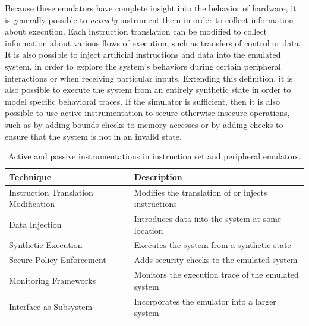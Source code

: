 Because these emulators have complete insight into the behavior of hardware, it is generally possible to \emph{actively} instrument them in order to collect information about execution.
Each instruction translation can be modified to collect information about various flows of execution, such as transfers of control or data.
It is also possible to inject artificial instructions and data into the emulated system, in order to explore the system's behaviors during certain peripheral interactions or when receiving particular inputs.
Extending this definition, it is also possible to execute the system from an entirely synthetic state in order to model specific behavioral traces.
If the simulator is sufficient, then it is also possible to use active instrumentation to secure otherwise insecure operations, such as by adding bounds checks to memory accesses or by adding checks to ensure that the system is not in an invalid state.

\begin{table}[h]
\centering
\begin{tabular}{|l|l|}
\hline
\textbf{Technique} & \textbf{Description} \\ \hline
\multirow{2}{*}{Instruction Translation Modification} & \multirow{2}{*}{Modifies the translation of or injects instructions} \\
 & \\ \hline
\multirow{2}{*}{Data Injection} & \multirow{2}{*}{Introduces data into the system at some location} \\
 & \\ \hline
\multirow{2}{*}{Synthetic Execution} & \multirow{2}{*}{Executes the system from a synthetic state} \\
 & \\ \hline
\multirow{2}{*}{Secure Policy Enforcement} & \multirow{2}{*}{Adds security checks to the emulated system} \\
 & \\ \hline
\multirow{2}{*}{Monitoring Frameworks} & \multirow{2}{*}{Monitors the execution trace of the emulated system} \\
 & \\ \hline
\multirow{2}{*}{Interface as Subsystem} & \multirow{2}{*}{Incorporates the emulator into a larger system} \\
 & \\ \hline
\end{tabular}
\caption{Active and passive instrumentations in instruction set and peripheral emulators.}
\label{tab:instruments}
\end{table}

